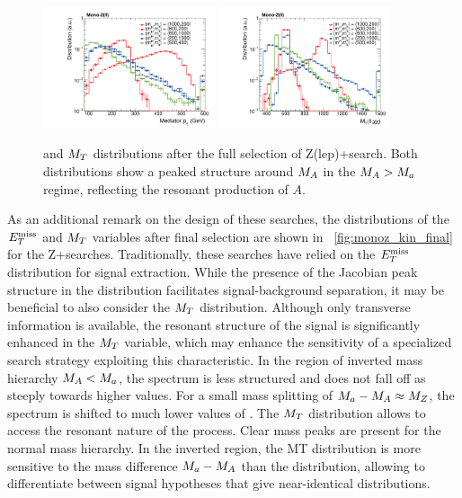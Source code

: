 \begin{figure}%
\centering
\includegraphics[width=0.45\textwidth]{texinputs/04_grid/figures/monoz/leptonic/dmwg-final_h_pt_med_dm.pdf}
\includegraphics[width=0.45\textwidth]{texinputs/04_grid/figures/monoz/leptonic/dmwg-final_h_mt_total.pdf}
\caption{\MET and  $M_{T}$ distributions after the full selection of Z(lep)+\MET search. Both distributions show a peaked structure around $M_{A}$ in the $M_{A} > M_{a}$ regime, reflecting the resonant production of $A$.}
\label{fig:monoz_kin_final}
\end{figure}

As an additional remark on the design of these searches, the distributions of the $E_T^\mathrm{miss}$ and $M_{T}$ variables after final selection are shown in ~\autoref{fig:monoz_kin_final} for the Z+\MET searches. Traditionally, these searches have relied on the $E_T^\mathrm{miss}$ distribution for signal extraction. While the presence of the Jacobian peak structure in the distribution facilitates signal-background separation, it may be beneficial to also consider the $M_{T}$ distribution. Although only transverse information is available, the resonant structure of the signal is significantly enhanced in the $M_{T}$ variable, which may enhance the sensitivity of a specialized search strategy exploiting this characteristic.
In the region of inverted mass hierarchy $M_{A} < M_{a}$, the \MET spectrum is less structured and does not fall off as steeply towards higher values. For a small mass splitting of $M_{a}-M_{A}\approx M_{Z}$, the spectrum is shifted to much lower values of \MET. 
The $M_{T}$ distribution allows to access the resonant nature of the process. Clear mass peaks are present for the normal mass hierarchy. In the inverted region, the MT distribution is more sensitive to the mass difference $M_{a}-M_{A}$ than the \MET distribution, allowing to differentiate between signal hypotheses that give near-identical \MET distributions.

